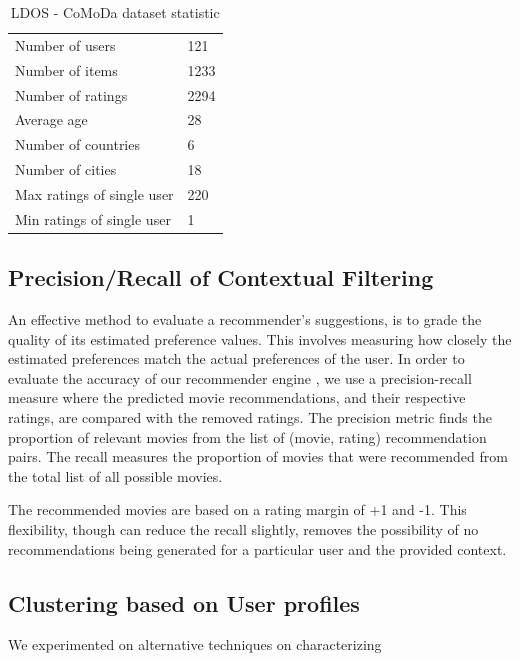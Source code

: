 \documentclass{article}
\begin{document}
\begin{table} [H]
	\caption{LDOS - CoMoDa dataset statistic}
	\centering        
    \begin{tabular}{l|l}
    \hline
    Number of users            & 121 \\
    Number of items            & 1233  \\
    Number of ratings          & 2294  \\
    Average age                & 28  \\
    Number of countries        & 6  \\
    Number of cities           & 18  \\
    Max ratings of single user & 220  \\
    Min ratings of single user & 1  \\
    \end{tabular}
    \label{ldos}
\end{table}

\subsection{Precision/Recall of Contextual Filtering}
An effective method to evaluate a recommender's suggestions, is to grade the quality of its estimated preference values. This involves measuring how closely the estimated preferences match the actual preferences of the user. In order to evaluate the accuracy of our recommender engine , we use a precision-recall measure where the predicted movie recommendations, and their respective ratings, are compared with the removed ratings. The precision metric finds the proportion of relevant movies from the list of (movie, rating) recommendation pairs. The recall measures the proportion of movies that were recommended from the total list of all possible movies. 

The recommended movies are based on a rating margin of +1 and -1. This flexibility, though can reduce the recall slightly, removes the possibility of no recommendations being generated for a particular user and the provided context.

\subsection{Clustering based on User profiles}
 We experimented on alternative techniques on characterizing 
\end{document}
